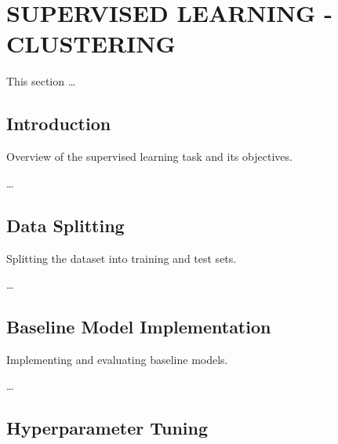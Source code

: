 

\section{SUPERVISED LEARNING - CLUSTERING}

    This section \ldots

    \subsection{Introduction}
    
        Overview of the supervised learning task and its objectives.

        \ldots

    \subsection{Data Splitting}
    
        Splitting the dataset into training and test sets.

        \ldots
        
    \subsection{Baseline Model Implementation}
    
        Implementing and evaluating baseline models.

        \ldots
        
    \subsection{Hyperparameter Tuning}
    
